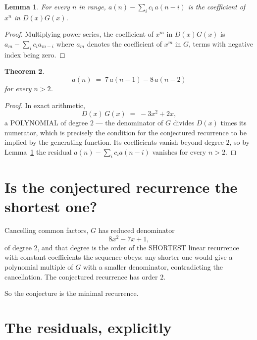 \documentclass[11pt,a4paper]{article}
\theoremstyle{plain}
\newtheorem{theorem}{Theorem}
\newtheorem{lemma}[theorem]{Lemma}
\theoremstyle{definition}
\begin{document}
\begin{lemma}\label{lem:key}
For every $n$ in range, $a(n)-\sum_i c_i\,a(n-i)$ is the coefficient of $x^{n}$ in
$D(x)G(x)$.
\end{lemma}

\begin{proof}
Multiplying power series, the coefficient of $x^{m}$ in $D(x)G(x)$ is
$a_m-\sum_i c_i a_{m-i}$ where $a_m$ denotes the coefficient of $x^{m}$ in $G$, terms with
negative index being zero.
\end{proof}

\begin{theorem}
\[
a(n)\;=\;7\,a(n-1) - 8\,a(n-2)
\]
for every $n>2$.
\end{theorem}

\begin{proof}
In exact arithmetic,
\[
D(x)\,G(x)\;=\;- 3 x^{2} + 2 x,
\]
a POLYNOMIAL of degree $2$ --- the denominator of $G$ divides $D(x)$ times its numerator,
which is precisely the condition for the conjectured recurrence to be implied by the
generating function. Its coefficients vanish beyond degree $2$, so by
Lemma~\ref{lem:key} the residual $a(n)-\sum_ic_ia(n-i)$ vanishes for every
$n>2$.
\end{proof}

\section{Is the conjectured recurrence the shortest one?}

Cancelling common factors, $G$ has reduced denominator
\[
8 x^{2} - 7 x + 1,
\]
of degree $2$, and that degree is the order of the SHORTEST linear recurrence with
constant coefficients the sequence obeys: any shorter one would give a polynomial multiple of
$G$ with a smaller denominator, contradicting the cancellation. The conjectured recurrence has
order $2$.

So the conjecture is the minimal recurrence.

\section{The residuals, explicitly}
\end{document}
